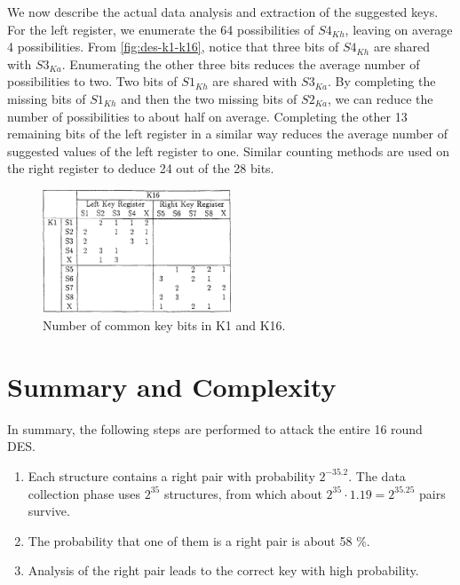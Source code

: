 \documentclass[twoside]{article}
\begin{document}
We now describe the actual data analysis and extraction of the suggested keys.
For the left register, we enumerate the 64 possibilities of \(S4_{Kh}\), leaving
on average 4 possibilities. From \autoref{fig:des-k1-k16}, notice that three
bits of \(S4_{Kh}\) are shared with \(S3_{Ka}\). Enumerating the other three
bits reduces the average number of possibilities to two. Two bits of \(S1_{Kh}\)
are shared with \(S3_{Ka}\). By completing the missing bits of \(S1_{Kh}\) and
then the two missing bits of \(S2_{Ka}\), we can reduce the number of
possibilities to about half on average. Completing the other 13 remaining bits
of the left register in a similar way reduces the average number of suggested
values of the left register to one. Similar counting methods are used on the
right register to deduce 24 out of the 28 bits.

\begin{figure}[!ht]
    \centering
    \includegraphics[width=0.5\textwidth]{images/des-k1-k16.png}
    \caption{Number of common key bits in K1 and K16.}
    \label{fig:des-k1-k16}
\end{figure}

\section{Summary and Complexity}

In summary, the following steps are performed to attack the entire 16 round DES.

\begin{enumerate}
    \item Each structure contains a right pair with probability \(2^{-35.2}\).
    The data collection phase uses \(2^{35}\) structures, from which about
    \(2^{35} \cdot 1.19 = 2^{35.25}\) pairs survive.
    \item The probability that one of them is a right pair is about 58 \%.
    \item Analysis of the right pair leads to the correct key with high
    probability.
\end{enumerate}
\end{document}

